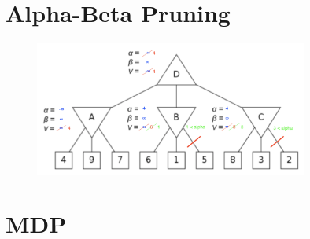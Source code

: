 \documentclass{article}
\begin{document}
\section{Alpha-Beta Pruning}

\begin{figure}[h] 
    \begin{center}
        \includegraphics[width=0.8\textwidth]{img/alphaBeta.png} 
    \end{center}
\end{figure}

\newpage

\section{MDP}
\end{document}
